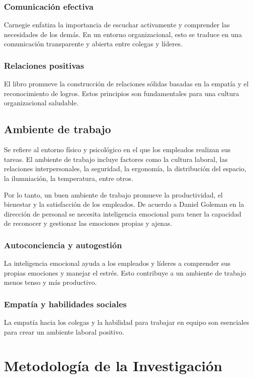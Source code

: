 \documentclass[journal]{IEEEtran}
\begin{document}
\subsubsection{Comunicación efectiva}
Carnegie enfatiza la importancia de escuchar activamente y comprender las necesidades de los demás. En un entorno organizacional, esto se traduce en una comunicación transparente y abierta entre colegas y líderes.

\subsubsection{Relaciones positivas}
El libro promueve la construcción de relaciones sólidas basadas en la empatía y el reconocimiento de logros. Estos principios son fundamentales para una cultura organizacional saludable.

\subsection{Ambiente de trabajo}
Se refiere al entorno físico y psicológico en el que los empleados realizan sus tareas. El ambiente de trabajo incluye factores como la cultura laboral, las relaciones interpersonales, la seguridad, la ergonomía, la distribución del espacio, la ilumniación, la temperatura, entre otros.

Por lo tanto, un buen ambiente de trabajo promueve la productividad, el bienestar y la satisfacción de los empleados. De acuerdo a Daniel Goleman en la dirección de personal se necesita inteligencia emocional para tener la capacidad de reconocer y gestionar las emociones propias y ajenas.

\subsubsection{Autoconciencia y autogestión}
La inteligencia emocional ayuda a los empleados y líderes a comprender sus propias emociones y manejar el estrés. Esto contribuye a un ambiente de trabajo menos tenso y más productivo.

\subsubsection{Empatía y habilidades sociales}
La empatía hacia los colegas y la habilidad para trabajar en equipo son esenciales para crear un ambiente laboral positivo.

\section{Metodología de la Investigación}
\end{document}
